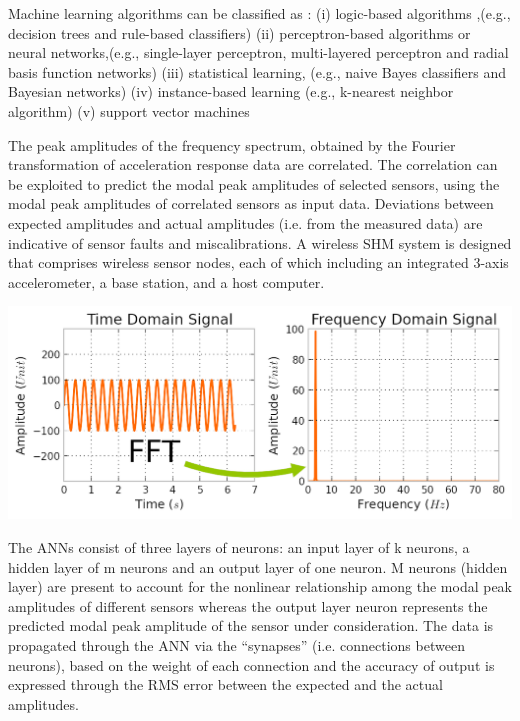 \documentclass{article}
\begin{document}
Machine learning  algorithms can be classified as :
(i) logic-based algorithms ,(e.g., decision trees and rule-based classifiers)
(ii) perceptron-based algorithms or neural networks,(e.g., single-layer perceptron, multi-layered perceptron and radial basis function networks)
(iii) statistical learning, (e.g., naive Bayes classifiers and Bayesian networks)			
(iv) instance-based learning (e.g., k-nearest neighbor algorithm)
(v) support vector machines

The peak amplitudes of the frequency spectrum, obtained by the Fourier transformation of acceleration response data are correlated. The correlation can be exploited to predict the modal peak amplitudes of selected sensors, using the modal peak amplitudes of correlated sensors as input data.  Deviations between expected amplitudes and actual amplitudes (i.e. from the measured data) are indicative of sensor faults and miscalibrations. A wireless SHM system is designed that comprises wireless sensor nodes, each of which including an integrated 3-axis accelerometer, a base station, and a host computer.

\begin{center}
    \includegraphics[scale=0.25]{Images/FFT.png}
    
\end{center}

The ANNs consist of three layers of neurons: an input layer of k neurons, a hidden layer of m neurons and  an output layer of one neuron. M neurons (hidden layer) are present to account for the nonlinear relationship among the modal peak amplitudes of different sensors whereas the output layer neuron represents the predicted modal peak amplitude of the sensor under consideration. The data is propagated through the ANN via the “synapses” (i.e. connections between neurons), based on the weight of each connection and the accuracy of output is expressed through the RMS error between the expected and the actual amplitudes.
\end{document}
